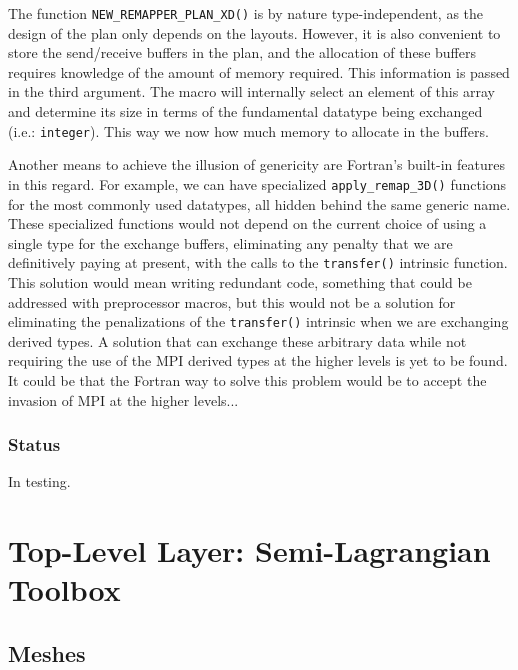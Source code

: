 \documentclass[]{report}   %
\begin{document}
The function \verb+NEW_REMAPPER_PLAN_XD()+ is by nature type-independent, as the design of the plan only depends on the layouts. However, it is also convenient to store the send/receive buffers in the plan, and the allocation of these buffers requires knowledge of the amount of memory required. This information is passed in the third argument. The macro will internally select an element of this array and determine its size in terms of the fundamental datatype being exchanged (i.e.: \verb+integer+). This way we now how much memory to allocate in the buffers.

Another means to achieve the illusion of genericity are Fortran's built-in features in this regard. For example, we can have specialized \verb+apply_remap_3D()+ functions for the most commonly used datatypes, all hidden behind the same generic name. These specialized functions would not depend on the current choice of using a single type for the exchange buffers, eliminating any penalty that we are definitively paying at present, with the calls to the \verb+transfer()+ intrinsic function. This solution would mean writing redundant code, something that could be addressed with preprocessor macros, but this would not be a solution for eliminating the penalizations of the \verb+transfer()+ intrinsic when we are exchanging derived types. A solution that can exchange these arbitrary data while not requiring the use of the MPI derived types at the higher levels is yet to be found. It could be that the Fortran way to solve this problem would be to accept the invasion of MPI at the higher levels...

\subsection{Status}

In testing.

\chapter{Top-Level Layer: Semi-Lagrangian Toolbox}










\section{Meshes}
\end{document}
